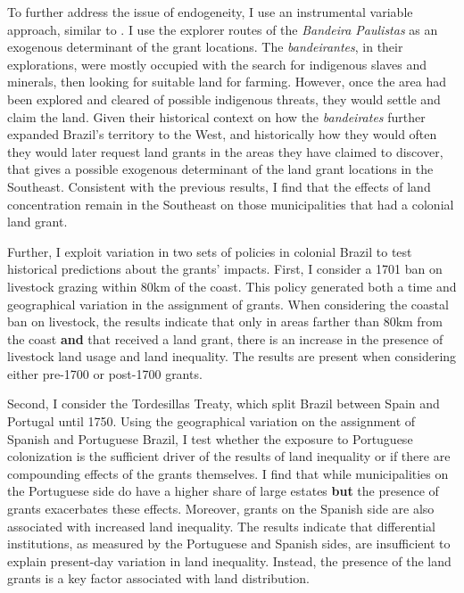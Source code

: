 \documentclass[11pt]{article}
\begin{document}
To further address the issue of endogeneity, I use an instrumental variable approach, similar to \textcite{Duranton2011-rv}. 
I use the explorer routes of the \textit{Bandeira Paulistas} as an exogenous determinant of the grant locations. 
The \textit{bandeirantes}, in their explorations, were mostly occupied with the search for indigenous slaves and minerals, then looking for suitable land for farming. 
However, once the area had been explored and cleared of possible indigenous threats, they would settle and claim the land. 
Given their historical context on how the \textit{bandeirates} further expanded Brazil's territory to the West, and historically how they would often they would later request land grants in the areas they have claimed to discover, that gives a possible exogenous determinant of the land grant locations in the Southeast. 
Consistent with the previous results, I find that the effects of land concentration remain in the Southeast on those municipalities that had a colonial land grant. 

Further, I exploit variation in two sets of policies in colonial Brazil to test historical predictions about the grants' impacts. 
First, I consider a 1701 ban on livestock grazing within 80km of the coast. 
This policy generated both a time and geographical variation in the assignment of grants. 
When considering the coastal ban on livestock, the results indicate that only in areas farther than 80km from the coast \textbf{and} that received a land grant, there is an increase in the presence of livestock land usage and land inequality.
The results are present when considering either pre-1700 or post-1700 grants.


Second, I consider the Tordesillas Treaty, which split Brazil between Spain and Portugal until 1750. 
Using the geographical variation on the assignment of Spanish and Portuguese Brazil, I test whether the exposure to Portuguese colonization is the sufficient driver of the results of land inequality or if there are compounding effects of the grants themselves.
I find that while municipalities on the Portuguese side do have a higher share of large estates \textbf{but} the presence of grants exacerbates these effects.
Moreover, grants on the Spanish side are also associated with increased land inequality.
The results indicate that differential institutions, as measured by the Portuguese and Spanish sides, are insufficient to explain present-day variation in land inequality. 
Instead, the presence of the land grants is a key factor associated with land distribution.
\end{document}
